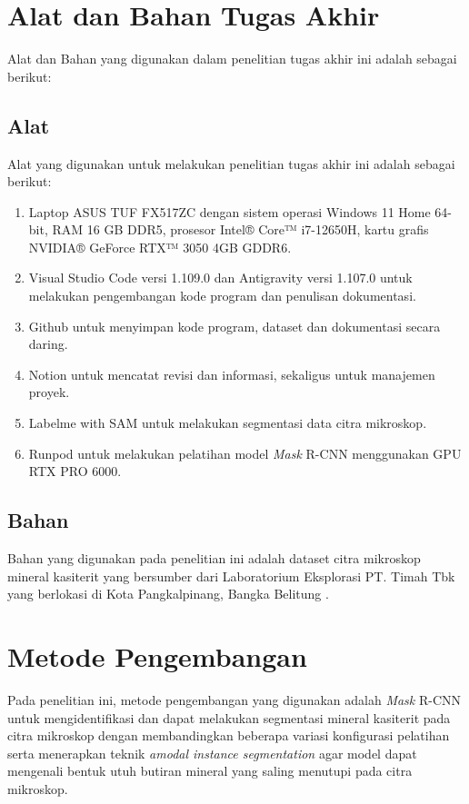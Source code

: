 \section{Alat dan Bahan Tugas Akhir} \label{III.Alat dan Bahan}
Alat dan Bahan yang digunakan dalam penelitian tugas akhir ini adalah sebagai berikut: \par

\subsection{Alat} \label{III.Alat}
Alat yang digunakan untuk melakukan penelitian tugas akhir ini adalah sebagai berikut: \par
\begin{enumerate}[noitemsep]
	\item Laptop ASUS TUF FX517ZC dengan sistem operasi Windows 11 Home 64-bit, RAM 16 GB DDR5, prosesor Intel® Core™ i7-12650H, kartu grafis NVIDIA® GeForce RTX™ 3050 4GB GDDR6.
	\item Visual Studio Code versi 1.109.0 dan Antigravity versi 1.107.0 untuk melakukan pengembangan kode program dan penulisan dokumentasi.
	\item Github untuk menyimpan kode program, dataset dan dokumentasi secara daring.
	\item Notion untuk mencatat revisi dan informasi, sekaligus untuk manajemen proyek.
	\item Labelme with SAM \cite{Wada_Labelme_Image_Polygonal} untuk melakukan segmentasi data citra mikroskop.
	\item Runpod untuk melakukan pelatihan model \textit{Mask} R-CNN menggunakan GPU RTX PRO 6000.
\end{enumerate}

\subsection{Bahan} \label{III.Bahan}
Bahan yang digunakan pada penelitian ini adalah dataset citra mikroskop mineral kasiterit yang bersumber dari Laboratorium Eksplorasi PT. Timah Tbk yang berlokasi di Kota Pangkalpinang, Bangka Belitung \cite{PTTimahWebsite}.\par

\section{Metode Pengembangan} \label{III.Metode}
Pada penelitian ini, metode pengembangan yang digunakan adalah \textit{Mask} R-CNN untuk mengidentifikasi dan dapat melakukan segmentasi mineral kasiterit pada citra mikroskop dengan membandingkan beberapa variasi konfigurasi pelatihan serta menerapkan teknik \textit{amodal instance segmentation} agar model dapat mengenali bentuk utuh butiran mineral yang saling menutupi pada citra mikroskop. 

